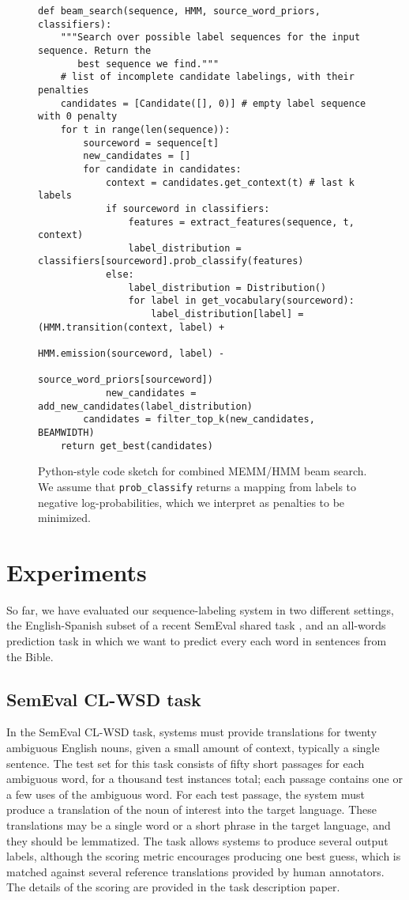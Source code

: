 \documentclass[11pt]{article}
\begin{document}
\begin{figure*}
\begin{lstlisting}[frame=none]
def beam_search(sequence, HMM, source_word_priors, classifiers):
    """Search over possible label sequences for the input sequence. Return the
       best sequence we find."""
    # list of incomplete candidate labelings, with their penalties
    candidates = [Candidate([], 0)] # empty label sequence with 0 penalty
    for t in range(len(sequence)):
        sourceword = sequence[t]
        new_candidates = []
        for candidate in candidates:
            context = candidates.get_context(t) # last k labels
            if sourceword in classifiers:
                features = extract_features(sequence, t, context)
                label_distribution = classifiers[sourceword].prob_classify(features)
            else:
                label_distribution = Distribution()
                for label in get_vocabulary(sourceword):
                    label_distribution[label] = (HMM.transition(context, label) +
                                                 HMM.emission(sourceword, label) -
                                                 source_word_priors[sourceword])
            new_candidates = add_new_candidates(label_distribution)
        candidates = filter_top_k(new_candidates, BEAMWIDTH)
    return get_best(candidates)

\end{lstlisting}
\caption{Python-style code sketch for combined MEMM/HMM beam search. We assume
that \texttt{prob\_classify} returns a mapping from labels to negative
log-probabilities, which we interpret as penalties to be minimized.
}
\label{fig:beamsearch}
\end{figure*}

\section{Experiments}
So far, we have evaluated our sequence-labeling system in two different
settings, the English-Spanish subset of a recent SemEval shared task
\cite{task10}, and an all-words prediction task in which we want to predict
every each word in sentences from the Bible.

\subsection{SemEval CL-WSD task}
In the SemEval CL-WSD task, systems must provide translations for twenty
ambiguous English nouns, given a small amount of context, typically a single
sentence. The test set for this task consists of fifty short passages for each
ambiguous word, for a thousand test instances total; each passage contains one
or a few uses of the ambiguous word. For each test passage, the system must
produce a translation of the noun of interest into the target language.  These
translations may be a single word or a short phrase in the target language, and
they should be lemmatized. The task allows systems to produce several output
labels, although the scoring metric encourages producing one best guess, which
is matched against several reference translations provided by human annotators.
The details of the scoring are provided in the task description paper.
\end{document}
